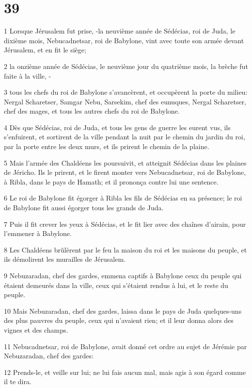 \chapter{39}

\par 1 Lorsque Jérusalem fut prise, -la neuvième année de Sédécias, roi de Juda, le dixième mois, Nebucadnetsar, roi de Babylone, vint avec toute son armée devant Jérusalem, et en fit le siège;
\par 2 la onzième année de Sédécias, le neuvième jour du quatrième mois, la brèche fut faite à la ville, -
\par 3 tous les chefs du roi de Babylone s'avancèrent, et occupèrent la porte du milieu: Nergal Scharetser, Samgar Nebu, Sarsekim, chef des eunuques, Nergal Scharetser, chef des mages, et tous les autres chefs du roi de Babylone.
\par 4 Dès que Sédécias, roi de Juda, et tous les gens de guerre les eurent vus, ils s'enfuirent, et sortirent de la ville pendant la nuit par le chemin du jardin du roi, par la porte entre les deux murs, et ils prirent le chemin de la plaine.
\par 5 Mais l'armée des Chaldéens les poursuivit, et atteignit Sédécias dans les plaines de Jéricho. Ils le prirent, et le firent monter vers Nebucadnetsar, roi de Babylone, à Ribla, dans le pays de Hamath; et il prononça contre lui une sentence.
\par 6 Le roi de Babylone fit égorger à Ribla les fils de Sédécias en sa présence; le roi de Babylone fit aussi égorger tous les grands de Juda.
\par 7 Puis il fit crever les yeux à Sédécias, et le fit lier avec des chaînes d'airain, pour l'emmener à Babylone.
\par 8 Les Chaldéens brûlèrent par le feu la maison du roi et les maisons du peuple, et ils démolirent les murailles de Jérusalem.
\par 9 Nebuzaradan, chef des gardes, emmena captifs à Babylone ceux du peuple qui étaient demeurés dans la ville, ceux qui s'étaient rendus à lui, et le reste du peuple.
\par 10 Mais Nebuzaradan, chef des gardes, laissa dans le pays de Juda quelques-uns des plus pauvres du peuple, ceux qui n'avaient rien; et il leur donna alors des vignes et des champs.
\par 11 Nebucadnetsar, roi de Babylone, avait donné cet ordre au sujet de Jérémie par Nebuzaradan, chef des gardes:
\par 12 Prends-le, et veille sur lui; ne lui fais aucun mal, mais agis à son égard comme il te dira.
